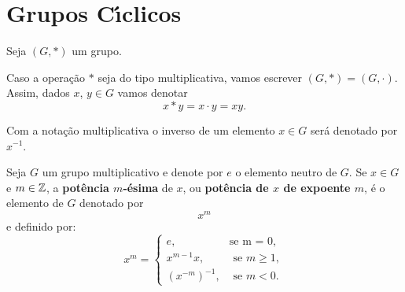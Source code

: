 \section{Grupos C{\'\i}clicos}

Seja $(G, *)$ um grupo.

Caso a opera\c{c}\~ao $*$ seja do tipo multiplicativa, vamos escrever $(G, *) = (G, \cdot)$. Assim, dados $x$, $y \in G$ vamos denotar
\[
    x * y = x \cdot y = xy.
\]

Com a nota\c{c}\~ao multiplicativa o inverso de um elemento $x \in G$ ser\'a denotado por $x^{-1}$.

\begin{definicao}
    Seja $G$ um grupo multiplicativo e denote por $e$ o elemento neutro de $G$. Se $x \in G$ e $m \in \mathbb{Z}$, a \textbf{pot\^encia $m$-\'esima} de $x$, ou \textbf{pot\^encia de $x$ de expoente $m$}, \'e o elemento de $G$ denotado por
        \[
            x^m
        \]
        e definido por:
        \[
            x^m = \begin{cases}
                    e, & \mbox{se m = 0},\\
                    x^{m-1}x, & \mbox{ se } m \ge 1,\\
                    (x^{-m})^{-1}, & \mbox{ se } m < 0.
                   \end{cases}
        \]
\end{definicao}


